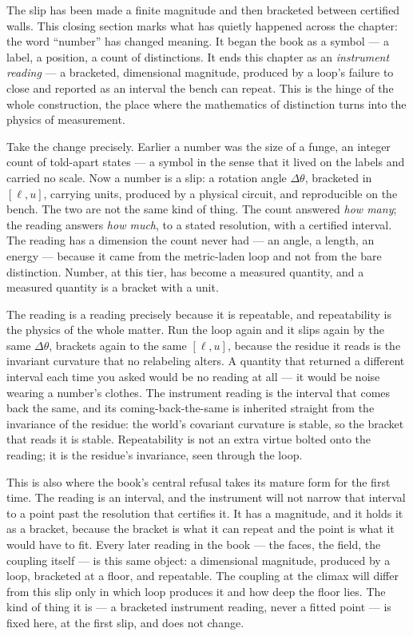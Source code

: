 The slip has been made a finite magnitude and then bracketed between certified walls. This closing section marks what has
quietly happened across the chapter: the word ``number'' has changed meaning. It began the book as a symbol --- a label, a
position, a count of distinctions. It ends this chapter as an \emph{instrument reading} --- a bracketed, dimensional
magnitude, produced by a loop's failure to close and reported as an interval the bench can repeat. This is the hinge of the
whole construction, the place where the mathematics of distinction turns into the physics of measurement.

Take the change precisely. Earlier a number was the size of a funge, an integer count of told-apart states --- a symbol in
the sense that it lived on the labels and carried no scale. Now a number is a slip: a rotation angle $\Delta\theta$, bracketed
in $[\ell, u]$, carrying units, produced by a physical circuit, and reproducible on the bench. The two are not the same kind
of thing. The count answered \emph{how many}; the reading answers \emph{how much}, to a stated resolution, with a certified
interval. The reading has a dimension the count never had --- an angle, a length, an energy --- because it came from the
metric-laden loop and not from the bare distinction. Number, at this tier, has become a measured quantity, and a measured
quantity is a bracket with a unit.

The reading is a reading precisely because it is repeatable, and repeatability is the physics of the whole matter. Run the
loop again and it slips again by the same $\Delta\theta$, brackets again to the same $[\ell, u]$, because the residue it reads
is the invariant curvature that no relabeling alters. A quantity that returned a different interval each time you asked would
be no reading at all --- it would be noise wearing a number's clothes. The instrument reading is the interval that comes back
the same, and its coming-back-the-same is inherited straight from the invariance of the residue: the world's covariant
curvature is stable, so the bracket that reads it is stable. Repeatability is not an extra virtue bolted onto the reading; it
is the residue's invariance, seen through the loop.

This is also where the book's central refusal takes its mature form for the first time. The reading is an interval, and the
instrument will not narrow that interval to a point past the resolution that certifies it. It has a magnitude, and it holds
it as a bracket, because the bracket is what it can repeat and the point is what it would have to fit. Every later reading in
the book --- the faces, the field, the coupling itself --- is this same object: a dimensional magnitude, produced by a loop,
bracketed at a floor, and repeatable. The coupling at the climax will differ from this slip only in which loop produces it
and how deep the floor lies. The kind of thing it is --- a bracketed instrument reading, never a fitted point --- is fixed
here, at the first slip, and does not change.


